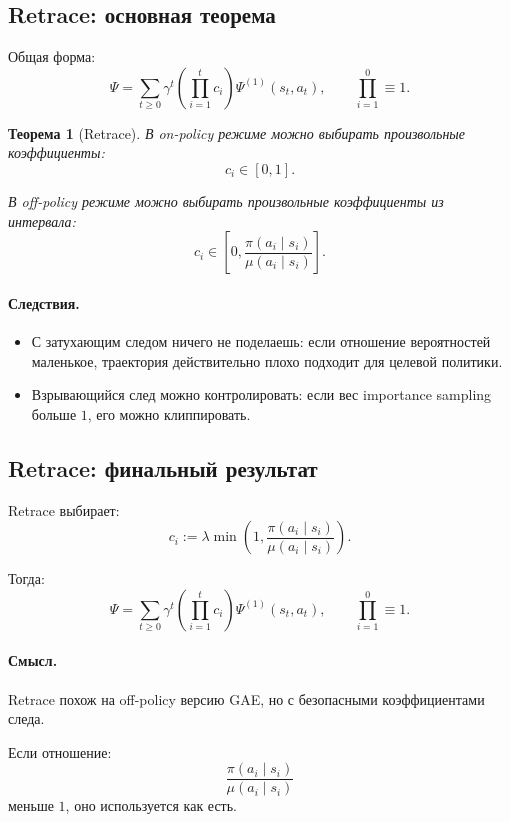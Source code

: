 \documentclass[12pt,a4paper]{article}
\newtheorem{theorem}{Теорема}
\begin{document}
\subsection{Retrace: основная теорема}

Общая форма:
\[
\Psi
=
\sum_{t\ge 0}
\gamma^t
\left(
\prod_{i=1}^{t}
c_i
\right)
\Psi^{(1)}(s_t,a_t),
\qquad
\prod_{i=1}^{0}
\equiv
1.
\]

\begin{theorem}[Retrace]
В on-policy режиме можно выбирать произвольные коэффициенты:
\[
c_i\in[0,1].
\]

В off-policy режиме можно выбирать произвольные коэффициенты из интервала:
\[
c_i
\in
\left[
0,
\frac{
\pi(a_i\mid s_i)
}{
\mu(a_i\mid s_i)
}
\right].
\]
\end{theorem}

\paragraph{Следствия.}

\begin{itemize}
    \item С затухающим следом ничего не поделаешь: если отношение вероятностей маленькое, траектория действительно плохо подходит для целевой политики.
    \item Взрывающийся след можно контролировать: если вес importance sampling больше $1$, его можно клиппировать.
\end{itemize}

\subsection{Retrace: финальный результат}

Retrace выбирает:
\[
c_i
:=
\lambda
\min
\left(
1,
\frac{
\pi(a_i\mid s_i)
}{
\mu(a_i\mid s_i)
}
\right).
\]

Тогда:
\[
\Psi
=
\sum_{t\ge 0}
\gamma^t
\left(
\prod_{i=1}^{t}
c_i
\right)
\Psi^{(1)}(s_t,a_t),
\qquad
\prod_{i=1}^{0}
\equiv
1.
\]

\paragraph{Смысл.}

Retrace похож на off-policy версию GAE, но с безопасными коэффициентами следа.

Если отношение:
\[
\frac{
\pi(a_i\mid s_i)
}{
\mu(a_i\mid s_i)
}
\]
меньше $1$, оно используется как есть.
\end{document}
